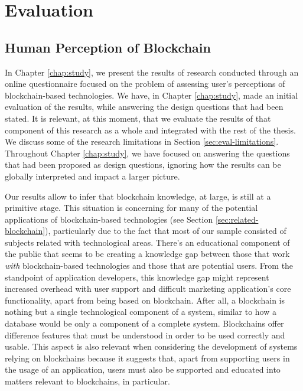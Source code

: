 \chapter{Evaluation}
\label{chap:evaluation}

\section{Human Perception of Blockchain}

In Chapter \ref{chap:study}, we present the results of research conducted through an online questionnaire focused on the problem of assessing user's perceptions of blockchain-based technologies. We have, in Chapter \ref{chap:study}, made an initial evaluation of the results, while answering the design questions that had been stated. It is relevant, at this moment, that we evaluate the results of that component of this research as a whole and integrated with the rest of the thesis. We discuss some of the research limitations in Section \ref{sec:eval-limitations}. Throughout Chapter \ref{chap:study}, we have focused on answering the questions that had been proposed as design questions, ignoring how the results can be globally interpreted and impact a larger picture.

Our results allow to infer that blockchain knowledge, at large, is still at a primitive stage. This situation is concerning for many of the potential applications of blockchain-based technologies (see Section \ref{sec:related-blockchain}), particularly due to the fact that most of our sample consisted of subjects related with technological areas. There's an educational component of the public that seems to be creating a knowledge gap between those that work \emph{with} blockchain-based technologies and those that are potential users. From the standpoint of application developers, this knowledge gap might represent increased overhead with user support and difficult marketing application's core functionality, apart from being based on blockchain. After all, a blockchain is nothing but a single technological component of a system, similar to how a database would be only a component of a complete system. Blockchains offer difference features that must be understood in order to be used correctly and usable. This aspect is also relevant when considering the development of systems relying on blockchains because it suggests that, apart from supporting users in the usage of an application, users must also be supported and educated into matters relevant to blockchains, in particular.

